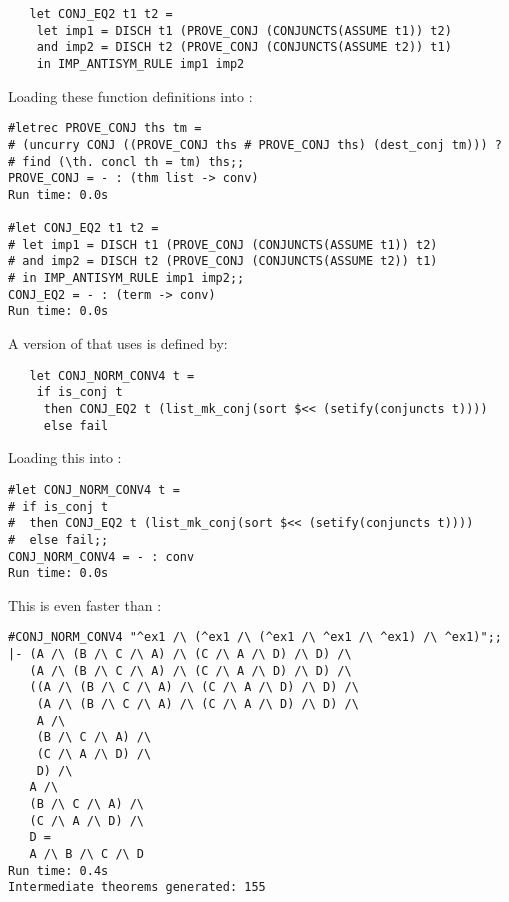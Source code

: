\begin{hol}\begin{verbatim}
   let CONJ_EQ2 t1 t2 =
    let imp1 = DISCH t1 (PROVE_CONJ (CONJUNCTS(ASSUME t1)) t2)
    and imp2 = DISCH t2 (PROVE_CONJ (CONJUNCTS(ASSUME t2)) t1) 
    in IMP_ANTISYM_RULE imp1 imp2
\end{verbatim}\end{hol}

\noindent Loading these \ML{} function definitions into \HOL:

\begin{session}\begin{verbatim}
#letrec PROVE_CONJ ths tm =
# (uncurry CONJ ((PROVE_CONJ ths # PROVE_CONJ ths) (dest_conj tm))) ?
# find (\th. concl th = tm) ths;;
PROVE_CONJ = - : (thm list -> conv)
Run time: 0.0s

#let CONJ_EQ2 t1 t2 =
# let imp1 = DISCH t1 (PROVE_CONJ (CONJUNCTS(ASSUME t1)) t2)
# and imp2 = DISCH t2 (PROVE_CONJ (CONJUNCTS(ASSUME t2)) t1) 
# in IMP_ANTISYM_RULE imp1 imp2;;
CONJ_EQ2 = - : (term -> conv)
Run time: 0.0s
\end{verbatim}\end{session}


\noindent A version of  that
uses  is defined by:

\begin{hol}\begin{verbatim}
   let CONJ_NORM_CONV4 t =
    if is_conj t
     then CONJ_EQ2 t (list_mk_conj(sort $<< (setify(conjuncts t))))
     else fail
\end{verbatim}\end{hol}


\noindent Loading this into \ML:

\begin{session}\begin{verbatim}
#let CONJ_NORM_CONV4 t =
# if is_conj t
#  then CONJ_EQ2 t (list_mk_conj(sort $<< (setify(conjuncts t))))
#  else fail;;
CONJ_NORM_CONV4 = - : conv
Run time: 0.0s
\end{verbatim}\end{session}

\noindent This is even faster than :

\begin{session}\begin{verbatim}
#CONJ_NORM_CONV4 "^ex1 /\ (^ex1 /\ (^ex1 /\ ^ex1 /\ ^ex1) /\ ^ex1)";;
|- (A /\ (B /\ C /\ A) /\ (C /\ A /\ D) /\ D) /\
   (A /\ (B /\ C /\ A) /\ (C /\ A /\ D) /\ D) /\
   ((A /\ (B /\ C /\ A) /\ (C /\ A /\ D) /\ D) /\
    (A /\ (B /\ C /\ A) /\ (C /\ A /\ D) /\ D) /\
    A /\
    (B /\ C /\ A) /\
    (C /\ A /\ D) /\
    D) /\
   A /\
   (B /\ C /\ A) /\
   (C /\ A /\ D) /\
   D =
   A /\ B /\ C /\ D
Run time: 0.4s
Intermediate theorems generated: 155
\end{verbatim}\end{session}

